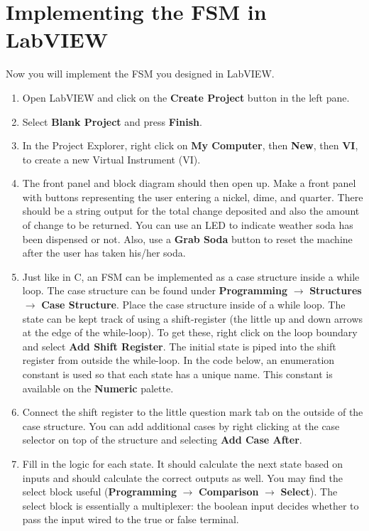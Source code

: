 \documentclass{article}
\begin{document}
\section*{Implementing the FSM in LabVIEW}
Now you will implement the FSM you designed in LabVIEW.

\begin{enumerate}
\item Open LabVIEW and click on the \textbf{Create Project} button in the left pane.
\item Select \textbf{Blank Project} and press \textbf{Finish}.
\item In the Project Explorer, right click on \textbf{My Computer}, then \textbf{New}, then \textbf{VI}, to create
a new Virtual Instrument (VI).
\item The front panel and block diagram should then open up. Make a front panel with buttons representing the user entering a nickel, dime, and quarter. There should be a string output for the total change deposited and also the amount of change to be returned. You can use an LED to indicate weather soda has been dispensed or not. Also, use a \textbf{Grab Soda} button to reset the machine after the user has taken his/her soda.
\item Just like in C, an FSM can be implemented as a case structure inside a while loop. The case structure can be found under \textbf{Programming} $\rightarrow$ \textbf{Structures} $\rightarrow$ \textbf{Case Structure}. Place the case structure inside of a while loop. The state can be kept track of using a shift-register (the little up and down arrows at the edge of the while-loop). To get these, right click on the loop boundary and select \textbf{Add Shift Register}. The initial state is piped into the shift register from outside the while-loop. In the code below, an enumeration constant is used so that each state has a unique name. This constant is available on the \textbf{Numeric} palette.
\item Connect the shift register to the little question mark tab on the outside of the case structure. You can add additional cases by right clicking at the case selector on top of the structure and selecting \textbf{Add Case After}.
\item Fill in the logic for each state. It should calculate the next state based on inputs and should calculate the correct outputs as well. You may find the select block useful (\textbf{Programming} $\rightarrow$ \textbf{Comparison} $\rightarrow$ \textbf{Select}). The select block is essentially a multiplexer: the boolean input decides whether to pass the input wired to the true or false terminal.
\end{enumerate}
\end{document}
